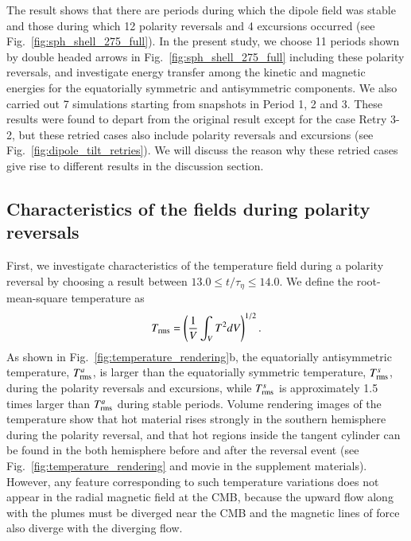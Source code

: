 The result shows that there are periods during which the dipole field was stable and those during which 12 polarity reversals and 4 excursions occurred (see Fig.~\ref{fig:sph_shell_275_full}).
In the present study, we choose 11 %
periods shown by double headed arrows in Fig.~\ref{fig:sph_shell_275_full} including these polarity reversals, and investigate energy transfer among the kinetic and magnetic energies for the equatorially symmetric and antisymmetric components. 
We also carried out 7 simulations starting from snapshots in Period 1, 2 and 3. 
These results were found to depart from the original result except for the case Retry 3-2, but these retried cases also include polarity reversals and excursions (see Fig.~\ref{fig:dipole_tilt_retries}). 
We will discuss the reason why these retried cases give rise to different results in the discussion section.

\subsection{Characteristics of the fields during polarity reversals}

First, we investigate characteristics of the temperature field during a polarity reversal by choosing a result between $13.0 \le t/\tau_{\eta} \le 14.0$. 
{\color{teal}
We define the root-mean-square temperature as
%
\begin{equation}
T_{\rm rms} = \left( \frac{1}{V}
  \int_V T^2 d V \right)^{1/2} .
\label{eq:Trms}
\end{equation}
%
}
{\color{teal}
As shown in Fig.~\ref{fig:temperature_rendering}b, the equatorially antisymmetric temperature, $T_{\rm rms}^a$, is larger than the equatorially symmetric temperature, $T_{\rm rms}^s$, during the polarity reversals and excursions, while $T_{\rm rms}^s$ is approximately 1.5 times larger than $T_{\rm rms}^a$ during stable periods.
}
Volume rendering images of the temperature show that hot material rises strongly in the southern hemisphere during the polarity reversal, and that hot regions inside the tangent cylinder can be found in the both hemisphere before and after the reversal event
(see Fig.~\ref{fig:temperature_rendering} and movie in the supplement materials). 
{\color{teal}
However, any feature corresponding to such temperature variations does not appear in the radial magnetic field at the CMB, 
}
because the upward flow along with the plumes must be diverged near the CMB and the magnetic lines of force also diverge with the diverging flow.

